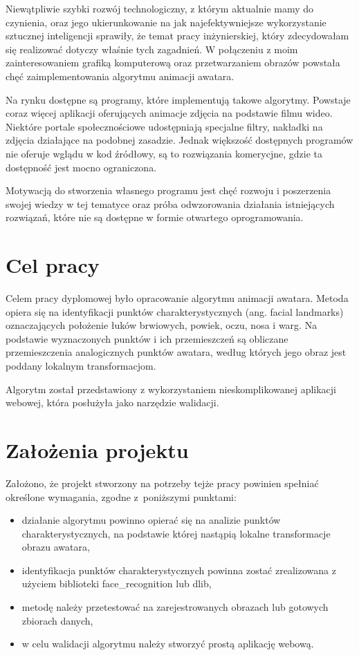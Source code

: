 Niewątpliwie szybki rozwój technologiczny, z którym aktualnie mamy do czynienia, oraz jego ukierunkowanie na jak najefektywniejsze wykorzystanie sztucznej inteligencji sprawiły, że temat pracy inżynierskiej, który zdecydowałam się realizować dotyczy właśnie tych zagadnień. W połączeniu z moim zainteresowaniem grafiką komputerową oraz przetwarzaniem obrazów powstała chęć zaimplementowania algorytmu animacji awatara.

Na rynku dostępne są programy, które implementują takowe algorytmy. Powstaje coraz więcej aplikacji oferujących animacje zdjęcia na podstawie filmu wideo. Niektóre portale społecznościowe udostępniają specjalne filtry, nakładki na zdjęcia działające na podobnej zasadzie. Jednak większość dostępnych programów nie oferuje wglądu w kod źródłowy, są to rozwiązania komerycjne, gdzie ta dostępność jest mocno ograniczona.

Motywacją do stworzenia własnego programu jest chęć rozwoju i poszerzenia swojej wiedzy w tej tematyce oraz próba odwzorowania działania istniejących rozwiązań, które nie są dostępne w formie otwartego oprogramowania. 



\section{Cel pracy}

Celem pracy dyplomowej było opracowanie algorytmu animacji awatara. Metoda opiera się na identyfikacji punktów charakterystycznych (ang. facial landmarks) oznaczających położenie łuków brwiowych, powiek, oczu, nosa i warg. Na podstawie wyznaczonych punktów i ich przemieszczeń są obliczane przemieszczenia analogicznych punktów awatara, według których jego obraz jest poddany lokalnym transformacjom.

Algorytm został przedstawiony z wykorzystaniem nieskomplikowanej aplikacji webowej, która posłużyła jako narzędzie walidacji.


\section{Założenia projektu}
\label{sec:zalozeniaProjektu}
Założono, że projekt stworzony na potrzeby tejże pracy powinien spełniać określone wymagania, zgodne z~poniższymi punktami:
\begin{itemize}
    \item działanie algorytmu powinno opierać się na analizie punktów charakterystycznych, na podstawie której nastąpią lokalne transformacje obrazu awatara,
    \item identyfikacja punktów charakterystycznych powinna zostać zrealizowana z użyciem biblioteki face\_recognition lub dlib,
    \item metodę należy przetestować na zarejestrowanych obrazach lub gotowych zbiorach danych,
    \item w celu walidacji algorytmu należy stworzyć prostą aplikację webową.
\end{itemize}

